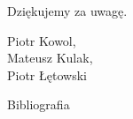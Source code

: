 \documentclass{beamer}
\begin{document}
    \begin{frame}
        \vspace*{2cm}
        \centering
        {\Huge Dziękujemy za uwagę.}
        \vspace*{\fill}
        \begin{flushright}
            Piotr Kowol, \\
            Mateusz Kulak, \\
            Piotr Łętowski
        \end{flushright}
    \end{frame}

    \begin{frame}[t, allowframebreaks]{Bibliografia}
        \nocite{*}
        \printbibliography
    \end{frame}
\end{document}
